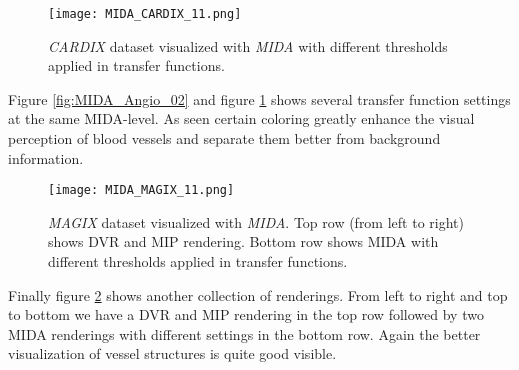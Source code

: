 \begin{figure}[h]
	\centering
	\texttt{[image: MIDA\_CARDIX\_11.png]} \\
	\caption{ \emph{CARDIX}\cite{gimias_sampledata_2018} dataset visualized with \emph{MIDA} with different thresholds applied in transfer functions.}
	\label{fig:MIDA_CARDIX_11}
\end{figure}

Figure \ref{fig:MIDA_Angio_02} and figure \ref{fig:MIDA_CARDIX_11} shows several transfer function settings at the same MIDA-level. As seen certain coloring greatly enhance the visual perception of blood vessels and separate them better from background information.

\begin{figure}[h]
	\centering
	\texttt{[image: MIDA\_MAGIX\_11.png]} \\
	\caption{ \emph{MAGIX}\cite{gimias_sampledata_2018} dataset visualized with \emph{MIDA}. Top row (from left to right) shows DVR and MIP rendering. Bottom row shows MIDA with different thresholds applied in transfer functions.}
	\label{fig:MIDA_MAGIX_11}
\end{figure}

Finally figure \ref{fig:MIDA_MAGIX_11} shows another collection of renderings. From left to right and top to bottom we have a DVR and MIP rendering in the top row followed by two MIDA renderings with different settings in the bottom row. Again the better visualization of vessel structures is quite good visible.
